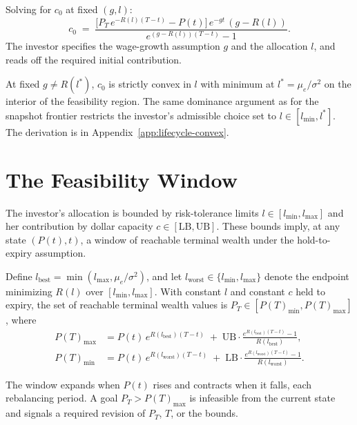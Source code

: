 \documentclass[11pt]{article}
\begin{document}
Solving for $c_0$ at fixed $(g, l)$:
\begin{equation}
  \label{eq:c0}
  c_0 \;=\;
  \frac{\bigl[P_T\, e^{-R(l)(T-t)} - P(t)\bigr]\,
        e^{-gt}\,(g - R(l))}
       {e^{(g - R(l))(T-t)} - 1}.
\end{equation}
The investor specifies the wage-growth assumption $g$ and the
allocation $l$, and reads off the required initial contribution.

At fixed $g \neq R(l^*)$, $c_0$ is strictly convex in $l$ with
minimum at $l^* = \mu_e/\sigma^2$ on the interior of the feasibility
region. The same dominance argument as for the snapshot frontier
restricts the investor's admissible choice set to $l \in [l_{\min},
l^*]$. The derivation is in Appendix~\ref{app:lifecycle-convex}.

\section{The Feasibility Window}
\label{sec:feasibility}

The investor's allocation is bounded by risk-tolerance limits
$l \in [l_{\min}, l_{\max}]$ and her contribution by dollar capacity
$c \in [\text{LB}, \text{UB}]$. These bounds imply, at any state
$(P(t), t)$, a window of reachable terminal wealth under the
hold-to-expiry assumption.

Define $l_{\text{best}} = \min(l_{\max}, \mu_e/\sigma^2)$, and let
$l_{\text{worst}} \in \{l_{\min}, l_{\max}\}$ denote the endpoint
minimizing $R(l)$ over $[l_{\min}, l_{\max}]$. With constant $l$ and
constant $c$ held to expiry, the set of reachable terminal wealth
values is $P_T \in [P(T)_{\min}, P(T)_{\max}]$, where
\begin{align}
  \label{eq:Pmax}
  P(T)_{\max} &= P(t)\, e^{R(l_{\text{best}})(T-t)}
  \;+\; \mathrm{UB} \cdot \frac{e^{R(l_{\text{best}})(T-t)} - 1}{R(l_{\text{best}})}, \\
  \label{eq:Pmin}
  P(T)_{\min} &= P(t)\, e^{R(l_{\text{worst}})(T-t)}
  \;+\; \mathrm{LB} \cdot \frac{e^{R(l_{\text{worst}})(T-t)} - 1}{R(l_{\text{worst}})}.
\end{align}

The window expands when $P(t)$ rises and contracts when it falls,
each rebalancing period. A goal $P_T > P(T)_{\max}$ is infeasible
from the current state and signals a required revision of $P_T$, $T$,
or the bounds.

\end{document}
